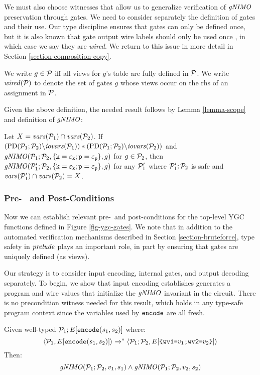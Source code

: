 We must also choose witnesses that allow us to generalize verification
of $\mathit{gNIMO}$ preservation through gates. We need to consider separately
the definition of gates and their use. Our type discipline ensures that
gates can only be defined once, but it is also known that gate output
wire labels should only be used once \cite{nieminen2023breaking}, in which case we
say they are \emph{wired}. We return to this issue in more detail in
Section \ref{section-composition-copy}.
\begin{definition}
  We write $g \in \mathcal{P}$ iff all views for $g$'s table are fully
  defined in $\mathcal{P}$. We write $\mathit{wired}(\mathcal{P})$ to denote the
  set of gates $g$ whose views occur on the rhs of an assignment
  in $\mathcal{P}$.
\end{definition}
Given the above definition, the needed result follows by Lemma \ref{lemma-scope} and definition
of $\mathit{gNIMO}$:
\begin{lemma}
  \label{lemma-gnimo}
  Let $X = \mathit{vars}(\mathcal{P}_1) \cap \mathit{vars}(\mathcal{P}_2)$.
  If $(\mathrm{PD}(\mathcal{P}_1;\mathcal{P}_2)\backslash\mathit{iovars}(\mathcal{P}_1)) * (\mathrm{PD}(\mathcal{P}_1;\mathcal{P}_2)\backslash\mathit{iovars}(\mathcal{P}_2))$
  and
  $\mathit{gNIMO}(\mathcal{P}_1;\mathcal{P}_2,\{ \texttt{k} = \varepsilon_{\texttt{k}}; \texttt{p} = \varepsilon_{\texttt{p}}\}, g)$ for
  $g \in \mathcal{P}_2$,
  then $\mathit{gNIMO}(\mathcal{P}_1';\mathcal{P}_2,\{ \texttt{k} = \varepsilon_{\texttt{k}}; \texttt{p} = \varepsilon_{\texttt{p}}\}, g)$
  for any $\mathcal{P}_1'$ where $\mathcal{P}_1';\mathcal{P}_2$ is safe and
  $\mathit{vars}(\mathcal{P}_1') \cap \mathit{vars}(\mathcal{P}_2) = X$.
\end{lemma}

\subsubsection{Pre-~ and Post-Conditions}
\label{section-pre-post}
Now we can establish relevant pre-~and post-conditions for the
top-level YGC functions defined in Figure \ref{fig-ygc-gates}. We note
that in addition to the automated verification mechanisms described in
Section \ref{section-bruteforce}, type safety in $\mathit{prelude}$ plays an
important role, in part by ensuring that gates are uniquely defined
(as views).

Our strategy is to consider input encoding, internal gates, and
output decoding separately. To begin, we show that input encoding
establishes generates a program and wire values that initialize
the $\mathit{gNIMO}$ invariant in the circuit. There is no precondition
witness needed for this result, which holds in any type-safe
program context since the variables used by $\texttt{encode}$
are all fresh. 
\begin{lemma}
  \label{lemma-encode}
  Given well-typed $\mathcal{P}_1;E[\texttt{encode}(s_1,s_2)]$ where:
  $$
  \langle \mathcal{P}_1,E[\texttt{encode}(s_1,s_2)] \rangle \xrightarrow{}^{*}
  \langle \mathcal{P}_1;\mathcal{P}_2,E[\texttt{\{wv1=}v_1\texttt{;wv2=}v_2\texttt{\}}] \rangle
  $$
  Then:
  $$\mathit{gNIMO}(\mathcal{P}_1;\mathcal{P}_2,v_1,s_1) \wedge \mathit{gNIMO}(\mathcal{P}_1;\mathcal{P}_2,v_2,s_2)$$
\end{lemma}

